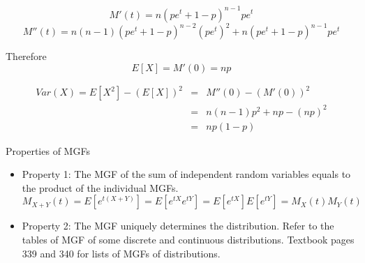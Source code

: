 \documentclass[slidestop,compress,mathserif]{beamer}
\begin{document}
\begin{frame}
$$M'(t) = n(pe^t + 1 - p)^{n-1} pe^t$$
$$M''(t) = n(n-1)(pe^t + 1 - p)^{n-2}(pe^t)^2 + n(pe^t + 1 - p)^{n-1}pe^t$$

Therefore
$$E[X] = M'(0) = np$$

\pause

\begin{eqnarray*}
Var(X) = E[X^2] - (E[X])^2 &=& M''(0) - (M'(0))^2 \\
&=& n(n-1)p^2 + np - (np)^2 \\
&=& np(1-p)
\end{eqnarray*}

\end{frame}

\begin{frame}{Properties of MGFs}
\begin{itemize}
\item Property 1: The MGF of the sum of independent random variables equals to the product of the individual MGFs.
$$M_{X+Y}(t) = E[e^{t(X+Y)}] = E[e^{tX}e^{tY}] = E[e^{tX}]E[e^{tY}] = M_X(t)M_Y(t)$$
\pause
\item Property 2: The MGF uniquely determines the distribution. Refer to the tables of MGF of some discrete and continuous distributions. {\color{red} Textbook pages 339 and 340 for lists of MGFs of distributions.}
\end{itemize}
\end{frame}
\end{document}
